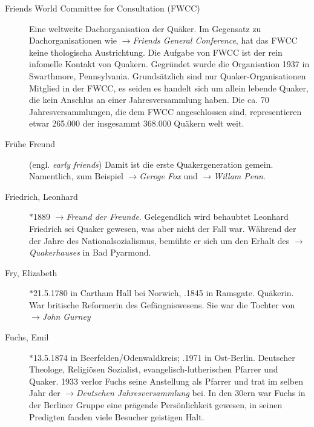 \begin{description}
 \item[Friends World Committee for Consultation (FWCC)] Eine weltweite
 Dachorganisation der Quäker. Im Gegensatz zu Dachorganisationen wie
 $\to$\textit{Friends General Conference}, hat das FWCC keine thologischa
 Austrichtung. Die Aufgabe von FWCC ist der rein infomelle Kontakt von Quakern.
 Gegründet wurde die Organisation 1937 in Swarthmore, Pennsylvania.
 Grundsätzlich sind nur Quaker-Organisationen Mitglied in der FWCC, es seiden
 es handelt sich um allein lebende Quaker, die kein Anschlus an einer
 Jahresversammlung haben. Die ca. 70 Jahresversammlungen, die dem FWCC
 angeschlossen sind, representieren etwar 265.000 der insgesammt 368.000
 Quäkern welt weit.



 \item[Frühe Freund] (engl. \textit{early friends}) Damit ist die erste
 Quakergeneration gemein. Namentlich, zum Beispiel $\to$\textit{Geroge Fox}
 und $\to$\textit{Willam Penn}.

  \item[Friedrich, Leonhard] $\ast$1889  $\to$\textit{Freund der
  Freunde}. Gelegendlich
  wird behaubtet Leonhard Friedrich sei Quaker gewesen, was aber nicht der
  Fall war. Während der der Jahre des Nationalsozialismus, bemühte er sich
  um den Erhalt des $\to$\textit{Quakerhauses} in Bad Pyarmond.

 \item[Fry, Elizabeth] $\ast$21.5.1780 in Cartham Hall bei Norwich,
 .1845 in Ramsgate. Quäkerin. War britische Reformerin des
 Gefängniswesens. Sie war die Tochter von $\to$\textit{John Gurney}

 \item[Fuchs, Emil] $\ast$13.5.1874 in Beerfelden/Odenwaldkreis; .1971
 in Ost-Berlin. Deutscher Theologe, Religiösen Sozialist,
 evangelisch-lutherischen Pfarrer und Quaker. 1933 verlor Fuchs seine
 Anstellung als Pfarrer und trat im selben Jahr der $\to$\textit{Deutschen
 Jahresversammlung} bei. In den 30ern war Fuchs in der Berliner Gruppe eine
 prägende Persönlichkeit gewesen, in seinen Predigten fanden viele Besucher
 geistigen Halt.


 \end{description}

\normalsize